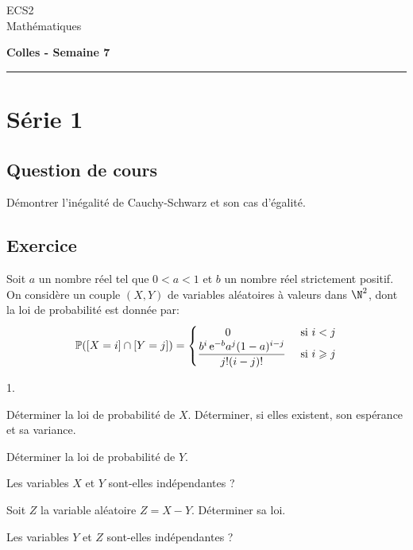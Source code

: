 \documentclass[11pt]{article}%
\begin{document}
\begin{flushleft}
ECS2 \\
Mathématiques
\end{flushleft}

\begin{center}
\textbf{\Large{Colles - Semaine 7}}
\end{center}

\hrule

\vspace*{0,2cm}


\section*{Série 1}
\subsection*{Question de cours}
\noindent
Démontrer l'inégalité de Cauchy-Schwarz et son cas d'égalité.

\subsection*{Exercice} %
\noindent
Soit $a$ un nombre r\'eel tel que $ 0 < a < 1$ et $ b$ un nombre r\'eel 
strictement positif.\\
On consid\`ere un couple $(X, Y)$ de variables al\'eatoires \`a valeurs 
dans  $\N^2$,
dont la loi de probabilit\'e est donn\'ee par:
\[
\Prob(\Ev{X=i}\cap \Ev{Y=j})=\begin{cases}\hfill 0\hfill &\text{ si 
$i<j$}\cr
\dfrac{b^i\, \ee^{-b}a^j(1-a)^{i-j}}{j!(i-j)!}&\text{ si $i\geq 
j$}\end{cases}
\]

\begin{noliste}{1.}
\item
D\'eterminer la loi de probabilit\'e de $X$. D\'eterminer, si elles 
existent, son esp\'erance et sa variance.
\item
D\'eterminer la loi de probabilit\'e de $ Y$.
\item
Les variables $X$ et $Y$ sont-elles ind\'ependantes ?
\item
Soit $Z$ la variable al\'eatoire  $Z = X-Y$. D\'eterminer sa loi.
\item
Les variables $Y$ et $Z$ sont-elles ind\'ependantes ?
\end{noliste}



\newpage
\end{document}
